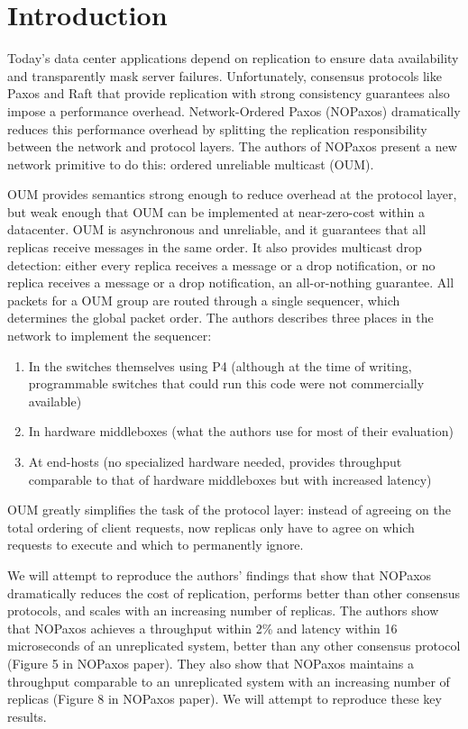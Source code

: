 \section{Introduction}

\indent Today's data center applications depend on replication to ensure data availability and transparently mask server failures. Unfortunately, consensus protocols like Paxos\cite{paxos,paxossimple} and Raft\cite{raft} that provide replication with strong consistency guarantees also impose a performance overhead. Network-Ordered Paxos\cite{nopaxos} (NOPaxos) dramatically reduces this performance overhead by splitting the replication responsibility between the network and protocol layers. The authors of NOPaxos present a new network primitive to do this: ordered unreliable multicast (OUM). 

OUM provides semantics strong enough to reduce overhead at the protocol layer, but weak enough that OUM can be implemented at near-zero-cost within a datacenter. OUM is asynchronous and unreliable, and it guarantees that all replicas receive messages in the same order. It also provides multicast drop detection: either every replica receives a message or a drop notification, or no replica receives a message or a drop notification, an all-or-nothing guarantee. All packets for a OUM group are routed through a single sequencer, which determines the global packet order. The authors describes three places in the network to implement the sequencer: 
\begin{enumerate}
\item In the switches themselves using P4 (although at the time of writing, programmable switches that could run this code were not commercially available)
\item In hardware middleboxes (what the authors use for most of their evaluation)
\item At end-hosts (no specialized hardware needed, provides throughput comparable to that of hardware middleboxes but with increased latency)
\end{enumerate}
OUM greatly simplifies the task of the protocol layer: instead of agreeing on the total ordering of client requests, now replicas only have to agree on which requests to execute and which to permanently ignore. 

We will attempt to reproduce the authors' findings that show that NOPaxos dramatically reduces the cost of replication, performs better than other consensus protocols, and scales with an increasing number of replicas. The authors show that NOPaxos achieves a throughput within 2\% and latency within 16 microseconds of an unreplicated system, better than any other consensus protocol (Figure 5 in NOPaxos paper\cite{nopaxos}). They also show that NOPaxos maintains a throughput comparable to an unreplicated system with an increasing number of replicas (Figure 8 in NOPaxos paper\cite{nopaxos}). We will attempt to reproduce these key results.


